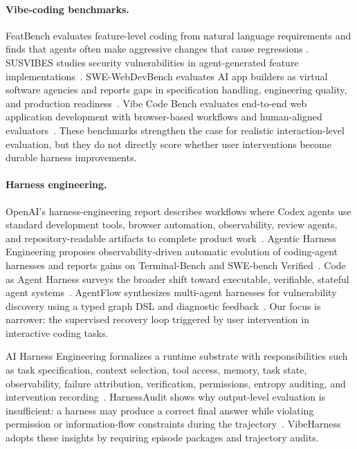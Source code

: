 \documentclass[11pt]{article}
\begin{document}
\paragraph{Vibe-coding benchmarks.}
FeatBench evaluates feature-level coding from natural language requirements and
finds that agents often make aggressive changes that cause regressions
\cite{chen2025featbench}. SUSVIBES studies security vulnerabilities in
agent-generated feature implementations~\cite{zhao2025susvibes}.
SWE-WebDevBench evaluates AI app builders as virtual software agencies and
reports gaps in specification handling, engineering quality, and production
readiness~\cite{saxena2026swewebdevbench}. Vibe Code Bench evaluates
end-to-end web application development with browser-based workflows and
human-aligned evaluators~\cite{tran2026vibecodebench}. These benchmarks
strengthen the case for realistic interaction-level evaluation, but they do not
directly score whether user interventions become durable harness improvements.

\paragraph{Harness engineering.}
OpenAI's harness-engineering report describes workflows where Codex agents use
standard development tools, browser automation, observability, review agents, and
repository-readable artifacts to complete product work~\cite{openai2026harness}.
Agentic Harness Engineering proposes observability-driven automatic evolution of
coding-agent harnesses and reports gains on Terminal-Bench and SWE-bench
Verified~\cite{lin2026ahe}. Code as Agent Harness surveys the broader shift
toward executable, verifiable, stateful agent systems~\cite{ning2026codeharness}.
AgentFlow synthesizes multi-agent harnesses for vulnerability discovery using a
typed graph DSL and diagnostic feedback~\cite{liu2026agentflow}. Our focus is
narrower: the supervised recovery loop triggered by user intervention in
interactive coding tasks.

AI Harness Engineering formalizes a runtime substrate with responsibilities such
as task specification, context selection, tool access, memory, task state,
observability, failure attribution, verification, permissions, entropy auditing,
and intervention recording~\cite{zhong2026aiharness}. HarnessAudit shows why
output-level evaluation is insufficient: a harness may produce a correct final
answer while violating permission or information-flow constraints during the
trajectory~\cite{liu2026harnessaudit}. VibeHarness adopts these insights by
requiring episode packages and trajectory audits.
\end{document}

